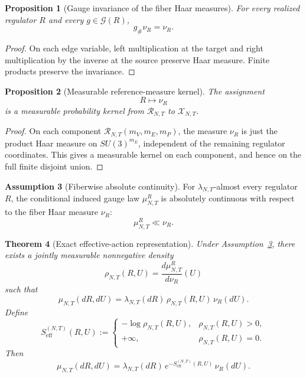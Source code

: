 \documentclass[11pt]{article}
\newtheorem{theorem}{Theorem}[section]
\newtheorem{proposition}[theorem]{Proposition}
\theoremstyle{definition}
\newtheorem{assumption}[theorem]{Assumption}
\theoremstyle{remark}
\begin{document}
\begin{proposition}[Gauge invariance of the fiber Haar measures]
\label{prop:gauge-invariance-fiber-haar}
For every realized regulator \(R\) and every \(g\in\mathcal G(R)\),
\[
g_{\#}\nu_R=\nu_R.
\]
\end{proposition}

\begin{proof}
On each edge variable, left multiplication at the target and right
multiplication by the inverse at the source preserve Haar measure. Finite
products preserve the invariance.
\end{proof}

\begin{proposition}[Measurable reference-measure kernel]
\label{prop:measurable-reference-kernel}
The assignment
\[
R\mapsto \nu_R
\]
is a measurable probability kernel from \(\mathscr R_{N,T}\) to
\(\mathscr X_{N,T}\).
\end{proposition}

\begin{proof}
On each component \(\mathscr R_{N,T}(m_V,m_E,m_P)\), the measure \(\nu_R\) is
just the product Haar measure on \(SU(3)^{m_E}\), independent of the remaining
regulator coordinates. This gives a measurable kernel on each component, and
hence on the full finite disjoint union.
\end{proof}

\begin{assumption}[Fiberwise absolute continuity]
\label{ass:fiberwise-absolute-continuity}
For \(\lambda_{N,T}\)-almost every regulator \(R\), the conditional induced
gauge law \(\mu_{N,T}^R\) is absolutely continuous with respect to the fiber
Haar measure \(\nu_R\):
\[
\mu_{N,T}^R\ll \nu_R.
\]
\end{assumption}

\begin{theorem}[Exact effective-action representation]
\label{thm:exact-effective-action}
Under Assumption~\ref{ass:fiberwise-absolute-continuity}, there exists a
jointly measurable nonnegative density
\[
\rho_{N,T}(R,U)=\frac{d\mu_{N,T}^R}{d\nu_R}(U)
\]
such that
\[
\mu_{N,T}(dR,dU)=\lambda_{N,T}(dR)\,\rho_{N,T}(R,U)\,\nu_R(dU).
\]
Define
\[
S_{\mathrm{eff}}^{(N,T)}(R,U):=
\begin{cases}
-\log \rho_{N,T}(R,U), & \rho_{N,T}(R,U)>0,\\[4pt]
+\infty, & \rho_{N,T}(R,U)=0.
\end{cases}
\]
Then
\[
\mu_{N,T}(dR,dU)=\lambda_{N,T}(dR)\,
e^{-S_{\mathrm{eff}}^{(N,T)}(R,U)}\,\nu_R(dU).
\]
\end{theorem}
\end{document}
